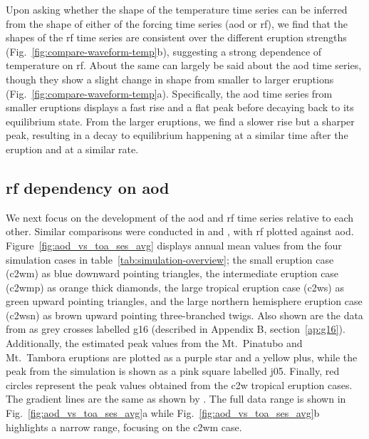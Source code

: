 \documentclass{ametsocV6.1}
\begin{document}
Upon asking whether the shape of the temperature time series can be inferred from the
shape of either of the forcing time series (\gls{aod} or \gls{rf}), we find that the
shapes of the \gls{rf} time series are consistent over the different eruption strengths
(Fig.~\ref{fig:compare-waveform-temp}b), suggesting a strong dependence of temperature
on \gls{rf}. About the same can largely be said about the \gls{aod} time series, though
they show a slight change in shape from smaller to larger eruptions
(Fig.~\ref{fig:compare-waveform-temp}a). Specifically, the \gls{aod} time series from
smaller eruptions displays a fast rise and a flat peak before decaying back to its
equilibrium state. From the larger eruptions, we find a slower rise but a sharper peak,
resulting in a decay to equilibrium happening at a similar time after the eruption and
at a similar rate.

\subsection{\gls{rf} dependency on \gls{aod}}

We next focus on the development of the \gls{aod} and \gls{rf} time series relative to
each other. Similar comparisons were conducted in \citet[][their Fig.\ 4]{gregory2016}
and \citet[][their Fig.\ 1]{marshall2020}, with \gls{rf} plotted against \gls{aod}.
Figure~\ref{fig:aod_vs_toa_ses_avg} displays annual mean values from the four simulation
cases in table~\ref{tab:simulation-overview}; the small eruption case (\gls{c2wm}) as
blue downward pointing triangles, the intermediate eruption case (\gls{c2wmp}) as orange
thick diamonds, the large tropical eruption case (\gls{c2ws}) as green upward pointing
triangles, and the large northern hemisphere eruption case (\gls{c2wsn}) as brown upward
pointing three-branched twigs. Also shown are the data from \citet[][Fig.\ 4, black
  crosses from HadCM3 sstPiHistVol]{gregory2016} as grey crosses labelled \gls{g16}
(described in Appendix B, section~\ref{ap:g16}). Additionally, the estimated peak values
from the Mt.\ Pinatubo and Mt.\ Tambora eruptions are plotted as a purple star and a
yellow plus, while the peak from the \citet{jones2005} simulation is shown as a pink
square labelled \gls{j05}. Finally, red circles represent the peak values obtained from
the \gls{c2w} tropical eruption cases. The gradient lines are the same as shown by
\citet{gregory2016}. The full data range is shown in Fig.~\ref{fig:aod_vs_toa_ses_avg}a
while Fig.~\ref{fig:aod_vs_toa_ses_avg}b highlights a narrow range, focusing on the
\gls{c2wm} case.
\end{document}
